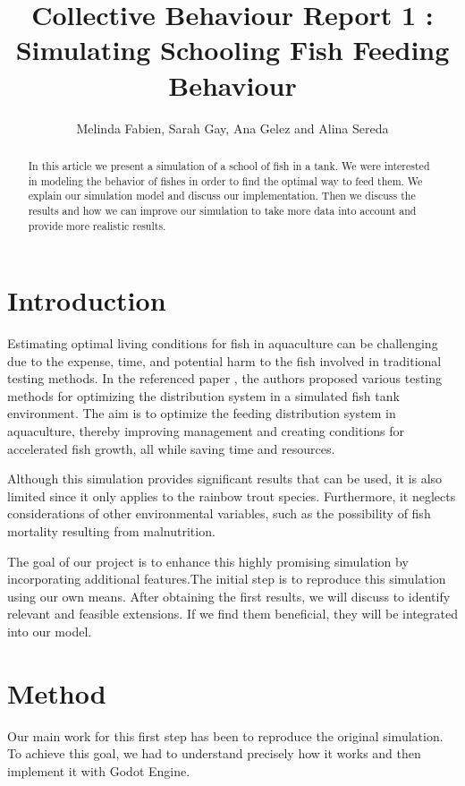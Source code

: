 \documentclass[9pt]{article}
\title{Collective Behaviour Report 1 : Simulating Schooling Fish Feeding Behaviour}
\author{Melinda Fabien, Sarah Gay, Ana Gelez and Alina Sereda}
\begin{document}
\maketitle

\begin{abstract}
In this article we present a simulation of a school of fish in a tank. We were interested in modeling the behavior of fishes in order to find the optimal way to feed them. We explain our simulation model and discuss our implementation. Then we discuss the results and how we can improve our simulation to take more data into account and provide more realistic results.
\end{abstract}

\section{Introduction}


Estimating optimal living conditions for fish in aquaculture can be challenging due to the expense, time, and potential harm to the fish involved in traditional testing methods. In the referenced paper \cite{article}, the authors proposed various testing methods for optimizing the distribution system in a simulated fish tank environment. The aim is to optimize the feeding distribution system in aquaculture, thereby improving management and creating conditions for accelerated fish growth, all while saving time and resources. 

Although this simulation provides significant results that can be used, it is also limited since it only applies to the rainbow trout species.  Furthermore, it neglects considerations of other environmental variables, such as the possibility of fish mortality resulting from malnutrition. 

The goal of our project is to enhance this highly promising simulation by incorporating additional features.The initial step is to reproduce this simulation using our own means. After obtaining the first results, we will discuss to identify relevant and feasible extensions. If we find them beneficial, they will be integrated into our model.


\section{Method}

Our main work for this first step has been to reproduce the original simulation. To achieve this goal, we had to understand precisely how it works and then implement it with Godot Engine.
\end{document}
